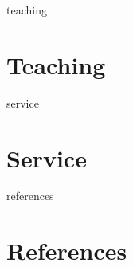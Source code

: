 \documentclass[12pt]{report} %
\begin{document}

\ifcsname teaching\endcsname%
\section{Teaching}
\teaching{}
\fi



\ifcsname service\endcsname%
\section{Service}
\service{}
\fi



\iffalse
\ifcsname languages\endcsname%
\section{Languages}
\languages{}
\fi
\fi



\iffalse
\ifcsname interests\endcsname%
\section{Interests}
\interests{}
\fi
\fi



\ifcsname references\endcsname%
\section{References}
\fi


\end{document}
